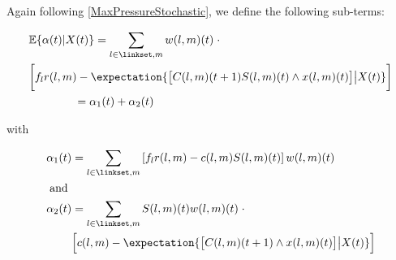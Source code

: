 Again following \eqref{MaxPressureStochastic}, we define the following sub-terms:
\begin{small}
\begin{align} \label{expected_short}
 & \mathbb{E}\{\alpha (t) | X(t)\} = \sum_{l \in \linkset,m} w(l,m)(t) \; \cdot   \\
 \nonumber  & \bigg[ f_l r(l,m) - \expectation{ \big[C(l,m)(t+1)S(l,m)(t)\wedge x(l,m)(t)\big] \big| X(t)}  \bigg]   \\  
 & \qquad \qquad = \alpha_1 (t) + \alpha_2 (t) \nonumber
\end{align}
\end{small}
with 
\begin{small}
\begin{align} \label{a1_def}
\alpha_1 (t) &=  \sum_{l \in \linkset,m} \left[ f_l r(l,m) - c(l,m)S(l,m)(t) \right] w(l,m)(t)   \\
\nonumber \text{ and }&  \\  \nonumber
 \alpha_2 (t) & =  \sum_{l \in \linkset,m}S(l,m)(t)w(l,m)(t)  \; \cdot   \\ 
&\Big[ c(l,m)- \expectation{ \big[C  (l,m)(t+1)\wedge x(l,m)(t)\big] \big| X(t) }  \Big]  
\end{align}
\end{small}
